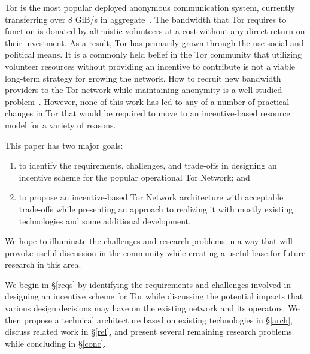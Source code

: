 Tor is the most popular deployed anonymous communication system, currently
transferring over 8 GiB/s in aggregate~\cite{tornetmet}. The bandwidth that Tor
requires to function is donated by altruistic volunteers at a cost without any
direct return on their investment. As a result, Tor has primarily grown through
the use social and political means. It is a commonly held belief in the Tor
community that utilizing volunteer resources without providing an incentive to
contribute is not a viable long-term strategy for growing the network. How to
recruit new bandwidth providers to the Tor network while maintaining anonymity
is a well studied problem~\cite{raykova-pet2008, wpes09-xpay, incentives-fc10,
ccs10-braids, acsac11-tortoise, jansen2013lira, johnson2013onions}. However,
none of this work has led to any of a number of practical changes in Tor that
would be required to move to an incentive-based resource model for a variety of
reasons.

This paper has two major goals:
\begin{enumerate}
\item to identify the requirements, challenges, and trade-offs in designing an
incentive scheme for the popular operational Tor Network; and 
\item to propose an incentive-based Tor Network architecture with acceptable
trade-offs while presenting an approach to realizing it with mostly existing
technologies and some additional development.
\end{enumerate}
We hope to illuminate the challenges and research problems in a way that will
provoke useful discussion in the community while creating a useful base for
future research in this area.

We begin in \S\ref{reqs} by identifying the requirements and challenges involved
in designing an incentive scheme for Tor while discussing the potential impacts
that various design decisions may have on the existing network and its
operators. We then propose a technical architecture based on existing
technologies in \S\ref{arch}, discuss related work in \S\ref{rel}, and present
several remaining research problems while concluding in \S\ref{conc}.
